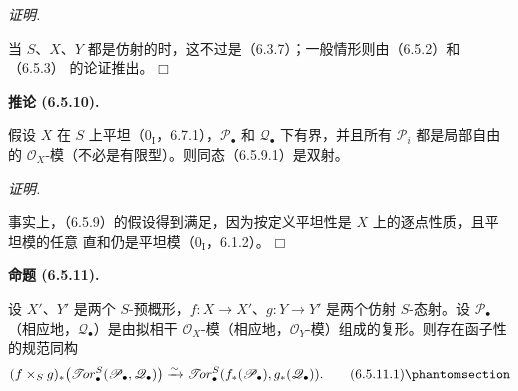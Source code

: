 \documentclass[UTF8,fontset=none,11pt,oneside,openany]{ctexbook}
\providecommand{\square}{\mdlgwhtsquare}
\newenvironment{proposition}[1][]{%
  \par\medskip\noindent\textbf{命题 (#1).}\ %
}{\par}
\newenvironment{proof}{%
  \par\smallskip\noindent\textit{证明.}\ %
}{\hfill$\square$\par}
\let\EGAOriginalLabel\label
\renewcommand{\label}[1]{\phantomsection\EGAOriginalLabel{#1}}
\newenvironment{namedtheorem}[2][]{%
  \par\medskip\noindent\textbf{#2 (#1).}\ %
}{\par}
\begin{document}
\begin{proof}
当 $S$、$X$、$Y$ 都是仿射的时，这不过是（6.3.7）；一般情形则由（6.5.2）和（6.5.3）
的论证推出。
\end{proof}
\begin{namedtheorem}[6.5.10]{推论}
假设 $X$ 在 $S$ 上平坦（$0_{\mathrm I}$，6.7.1），$\mathscr P_\bullet$ 和
$\mathscr Q_\bullet$ 下有界，并且所有 $\mathscr P_i$ 都是局部自由的
$\mathscr O_X$-模（不必是有限型）。则同态（6.5.9.1）是双射。
\end{namedtheorem}

\begin{proof}
事实上，（6.5.9）的假设得到满足，因为按定义平坦性是 $X$ 上的逐点性质，且平坦模的任意
直和仍是平坦模（$0_{\mathrm I}$，6.1.2）。
\end{proof}
\begin{proposition}[6.5.11]
设 $X'$、$Y'$ 是两个 $S$-预概形，$f:X\to X'$、$g:Y\to Y'$ 是两个仿射
$S$-态射。设 $\mathscr P_\bullet$（相应地，$\mathscr Q_\bullet$）是由拟相干
$\mathscr O_X$-模（相应地，$\mathscr O_Y$-模）组成的复形。则存在函子性的规范同构
\[
  (f\times_S g)_*
  \bigl(\mathscr{T}\!or_\bullet^S
    (\mathscr P_\bullet,\mathscr Q_\bullet)\bigr)
  \xrightarrow{\sim}
  \mathscr{T}\!or_\bullet^S
  (f_*(\mathscr P_\bullet),g_*(\mathscr Q_\bullet)).
  \tag{6.5.11.1}\label{III.6.5.11.1-fr}
\]
\end{proposition}
\end{document}
